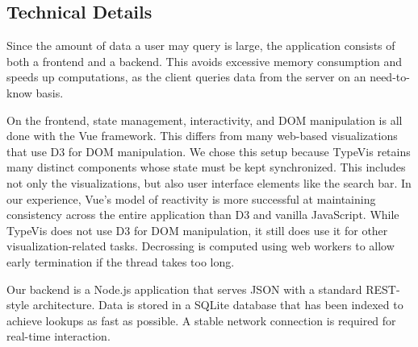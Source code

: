\documentclass{vgtc}                          %
\newcommand{\typevis}{{\sc TypeVis}\xspace}
\begin{document}
\subsection{Technical Details}

Since the amount of data a user may query is large,
the application consists of both a frontend and a backend.
This avoids excessive memory consumption and speeds up computations,
as the client queries data from the server on an need-to-know basis.

On the frontend, state management, interactivity,
and DOM manipulation is all done with the Vue framework.
This differs from many web-based visualizations
that use D3 for DOM manipulation.
We chose this setup because \typevis retains many distinct
components whose state must be kept synchronized.
This includes not only the visualizations, but also
user interface elements like the search bar.
In our experience, Vue's model of reactivity is
more successful at maintaining consistency across the
entire application than D3 and vanilla JavaScript.
While \typevis does not use D3 for DOM manipulation,
it still does use it for other visualization-related
tasks. Decrossing is computed using web workers
to allow early termination if the thread takes too long.

Our backend is a Node.js application that serves
JSON with a standard REST-style architecture.
Data is stored in a SQLite database that has been
indexed to achieve lookups as fast as possible.
A stable network connection is required for
real-time interaction.
\end{document}

